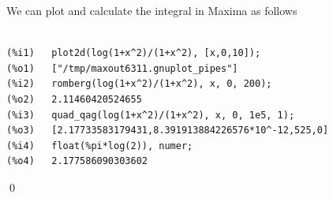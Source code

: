 We can plot and calculate the integral in Maxima as follows

\begin{verbatim}

(%i1)	plot2d(log(1+x^2)/(1+x^2), [x,0,10]);
(%o1)	["/tmp/maxout6311.gnuplot_pipes"]
(%i2)	romberg(log(1+x^2)/(1+x^2), x, 0, 200);
(%o2)	2.11460420524655
(%i3)	quad_qag(log(1+x^2)/(1+x^2), x, 0, 1e5, 1);
(%o3)	[2.17733583179431,8.391913884226576*10^-12,525,0]
(%i4)	float(%pi*log(2)), numer;
(%o4)	2.177586090303602

\end{verbatim}

\qed
